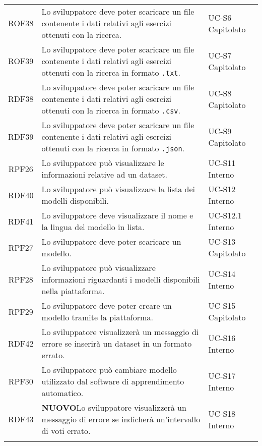 \begin{tabularx}{\textwidth}{| c | p{10cm} | X |}
		ROF38 & Lo sviluppatore deve poter scaricare un file contenente i dati relativi agli esercizi ottenuti con la ricerca. & UC-S6 \newline Capitolato\\
		ROF39 & Lo sviluppatore deve poter scaricare un file contenente i dati relativi agli esercizi ottenuti con la ricerca in formato \texttt{.txt}. & UC-S7 \newline Capitolato\\
		RDF38 & Lo sviluppatore deve poter scaricare un file contenente i dati relativi agli esercizi ottenuti con la ricerca in formato \texttt{.csv}. & UC-S8 \newline Capitolato\\
		RDF39 & Lo sviluppatore deve poter scaricare un file contenente i dati relativi agli esercizi ottenuti con la ricerca in formato \texttt{.json}. & UC-S9 \newline Capitolato\\
		RPF26 & Lo sviluppatore può visualizzare le informazioni relative ad un dataset. & UC-S11 \newline Interno\\
		RDF40 & Lo sviluppatore può visualizzare la lista dei modelli disponibili. & UC-S12 \newline Interno\\
		RDF41 & Lo sviluppatore deve visualizzare il nome e la lingua del modello in lista. & UC-S12.1 \newline Interno\\
		RPF27 & Lo sviluppatore deve poter scaricare un modello. & UC-S13 \newline Capitolato\\
		RPF28 & Lo sviluppatore può visualizzare informazioni riguardanti i modelli disponibili nella piattaforma. & UC-S14 \newline Interno\\
		RPF29 & Lo sviluppatore deve poter creare un modello tramite la piattaforma. & UC-S15 \newline Capitolato\\ 
		RDF42 & Lo sviluppatore visualizzerà un messaggio di errore se inserirà un dataset in un formato errato. & UC-S16 \newline Interno\\
		RPF30 & Lo sviluppatore può cambiare modello utilizzato dal software di apprendimento automatico. & UC-S17 \newline Interno\\
		RDF43 & \textbf{NUOVO}Lo sviluppatore visualizzerà un messaggio di errore se indicherà un'intervallo di voti errato. & UC-S18 \newline Interno\\
		\hline
		\caption{Tabella dei requisiti funzionali}
\end{tabularx}

